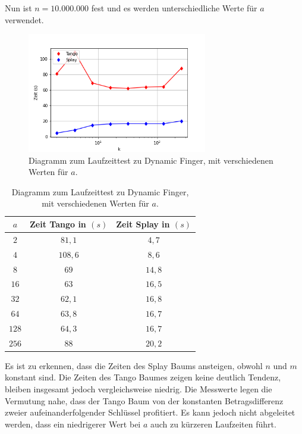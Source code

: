 \documentclass[a4paper,12pt]{article}
\begin{document}
\noindent Nun ist $n = 10.000.000$ fest und es werden unterschiedliche Werte für $a$ verwendet.

\begin{figure}[H]
	\centering
	\includegraphics[width=0.7\textwidth]{Medien/laufzeittest/diagramm/dynamicfingerNfest}
	\caption{Diagramm zum Laufzeittest zu Dynamic Finger, mit verschiedenen Werten für $a$.}
\end{figure}
\begin{table}[H]
	\begin{center}
		\begin{tabular}[c]{|c|c|c|}
			\hline
			$a$ & Zeit Tango in $\left(s\right)$ &Zeit Splay in $\left(s\right)$ \\
			\hline
			$2$ & $81,1$ &$4,7$ \\
			\hline
			$4$  & $108,6$ &$8,6$  \\
			\hline
			$8$  & $69$ &$14,8$  \\
			\hline
			$16$  & $63$ &$16,5$  \\
			\hline
			$32$  & $62,1$ &$16,8$  \\
			\hline
			$64$  & $63,8$ &$16,7$  \\
			\hline
			$128$  & $64,3$ &$16,7$  \\
			\hline
			$256$  & $88$ &$20,2$  \\
			\hline
		\end{tabular}
		\caption{Diagramm zum Laufzeittest zu Dynamic Finger, mit verschiedenen Werten für $a$.} 
	\end{center}
\end{table}\noindent Es ist zu erkennen, dass die Zeiten des Splay Baums ansteigen, obwohl $n$ und $m$ konstant sind. Die Zeiten des Tango Baumes zeigen keine deutlich Tendenz, bleiben insgesamt jedoch vergleichsweise niedrig. Die Messwerte legen die Vermutung nahe, dass der Tango Baum von der konstanten Betragsdifferenz zweier aufeinanderfolgender Schlüssel profitiert. Es kann jedoch nicht abgeleitet werden, dass ein niedrigerer Wert bei $a$ auch zu kürzeren Laufzeiten führt.  
\end{document}
